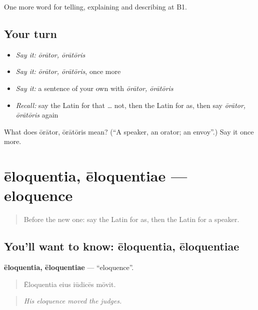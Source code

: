 \begin{grammarlens}[title={What you've built}]
One more word for telling, explaining and describing at B1.
\end{grammarlens}

\subsection*{Your turn}
\begin{itemize}
\raggedright
  \item \emph{Say it:} \emph{ōrātor, ōrātōris}
  \item \emph{Say it:} \emph{ōrātor, ōrātōris}, once more
  \item \emph{Say it:} a sentence of your own with \emph{ōrātor, ōrātōris}
  \item \emph{Recall:} say the Latin for that … not, then the Latin for as, then say \emph{ōrātor, ōrātōris} again
\end{itemize}

\begin{tcolorbox}[breakable,colback=teal!4,colframe=teal!35!black,title={Before you move on}]
What does ōrātor, ōrātōris mean? (\textquotedblleft{}A speaker, an orator; an envoy\textquotedblright{}.) Say it once more.
\end{tcolorbox}
\section[ēloquentia, ēloquentiae]{ēloquentia, ēloquentiae — eloquence}

\label{lesson:LA-C368-eloquentia}



\begin{quote}
Before the new one: say the Latin for as, then the Latin for a speaker.
\end{quote}

\subsection*{You'll want to know: ēloquentia, ēloquentiae}
\textbf{ēloquentia, ēloquentiae} — \textquotedblleft{}eloquence\textquotedblright{}.

\begin{quote}
Ēloquentia eius iūdicēs mōvit.
\end{quote}

\begin{quote}
\emph{His eloquence moved the judges.}
\end{quote}

